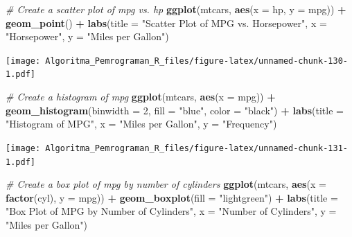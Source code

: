 \documentclass[
]{book}
\newenvironment{Shaded}{\begin{snugshade}}{\end{snugshade}}
\newcommand{\AttributeTok}[1]{\textcolor[rgb]{0.13,0.29,0.53}{#1}}
\newcommand{\CommentTok}[1]{\textcolor[rgb]{0.56,0.35,0.01}{\textit{#1}}}
\newcommand{\DecValTok}[1]{\textcolor[rgb]{0.00,0.00,0.81}{#1}}
\newcommand{\FunctionTok}[1]{\textcolor[rgb]{0.13,0.29,0.53}{\textbf{#1}}}
\newcommand{\NormalTok}[1]{#1}
\newcommand{\SpecialCharTok}[1]{\textcolor[rgb]{0.81,0.36,0.00}{\textbf{#1}}}
\newcommand{\StringTok}[1]{\textcolor[rgb]{0.31,0.60,0.02}{#1}}
\begin{document}
\begin{Shaded}
\begin{Highlighting}[]
\CommentTok{\# Create a scatter plot of mpg vs. hp}
\FunctionTok{ggplot}\NormalTok{(mtcars, }\FunctionTok{aes}\NormalTok{(}\AttributeTok{x =}\NormalTok{ hp, }\AttributeTok{y =}\NormalTok{ mpg)) }\SpecialCharTok{+}
  \FunctionTok{geom\_point}\NormalTok{() }\SpecialCharTok{+}
  \FunctionTok{labs}\NormalTok{(}\AttributeTok{title =} \StringTok{"Scatter Plot of MPG vs. Horsepower"}\NormalTok{,}
       \AttributeTok{x =} \StringTok{"Horsepower"}\NormalTok{,}
       \AttributeTok{y =} \StringTok{"Miles per Gallon"}\NormalTok{)}
\end{Highlighting}
\end{Shaded}

\texttt{[image: Algoritma\_Pemrograman\_R\_files/figure-latex/unnamed-chunk-130-1.pdf]}

\begin{Shaded}
\begin{Highlighting}[]
\CommentTok{\# Create a histogram of mpg}
\FunctionTok{ggplot}\NormalTok{(mtcars, }\FunctionTok{aes}\NormalTok{(}\AttributeTok{x =}\NormalTok{ mpg)) }\SpecialCharTok{+}
  \FunctionTok{geom\_histogram}\NormalTok{(}\AttributeTok{binwidth =} \DecValTok{2}\NormalTok{, }\AttributeTok{fill =} \StringTok{"blue"}\NormalTok{, }\AttributeTok{color =} \StringTok{"black"}\NormalTok{) }\SpecialCharTok{+}
  \FunctionTok{labs}\NormalTok{(}\AttributeTok{title =} \StringTok{"Histogram of MPG"}\NormalTok{,}
       \AttributeTok{x =} \StringTok{"Miles per Gallon"}\NormalTok{,}
       \AttributeTok{y =} \StringTok{"Frequency"}\NormalTok{)}
\end{Highlighting}
\end{Shaded}

\texttt{[image: Algoritma\_Pemrograman\_R\_files/figure-latex/unnamed-chunk-131-1.pdf]}

\begin{Shaded}
\begin{Highlighting}[]
\CommentTok{\# Create a box plot of mpg by number of cylinders}
\FunctionTok{ggplot}\NormalTok{(mtcars, }\FunctionTok{aes}\NormalTok{(}\AttributeTok{x =} \FunctionTok{factor}\NormalTok{(cyl), }\AttributeTok{y =}\NormalTok{ mpg)) }\SpecialCharTok{+}
  \FunctionTok{geom\_boxplot}\NormalTok{(}\AttributeTok{fill =} \StringTok{"lightgreen"}\NormalTok{) }\SpecialCharTok{+}
  \FunctionTok{labs}\NormalTok{(}\AttributeTok{title =} \StringTok{"Box Plot of MPG by Number of Cylinders"}\NormalTok{,}
       \AttributeTok{x =} \StringTok{"Number of Cylinders"}\NormalTok{,}
       \AttributeTok{y =} \StringTok{"Miles per Gallon"}\NormalTok{)}
\end{Highlighting}
\end{Shaded}
\end{document}
